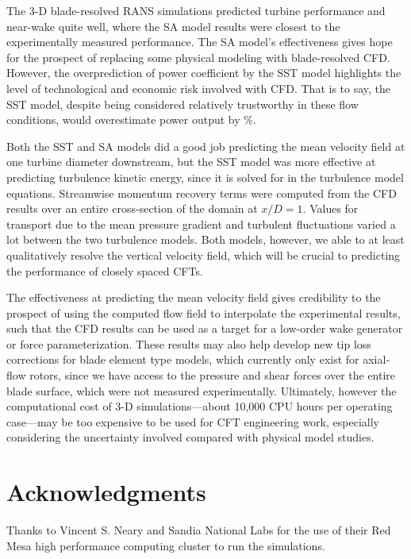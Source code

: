 The 3-D blade-resolved RANS simulations predicted turbine performance and
near-wake quite well, where the SA model results were closest to the
experimentally measured performance. The SA model's effectiveness gives hope for
the prospect of replacing some physical modeling with blade-resolved CFD.
However, the  overprediction of power coefficient by the SST model highlights
the level of technological and economic risk involved with CFD. That is to say,
the SST model, despite being considered relatively trustworthy in these flow
conditions, would overestimate power output by \%.

Both the SST and SA models did a good job predicting the mean velocity field at
one turbine diameter downstream, but the SST model was more effective at
predicting turbulence kinetic energy, since it is solved for in the turbulence
model equations. Streamwise momentum recovery terms were computed from the CFD
results over an entire cross-section of the domain at $x/D=1$. Values for
transport due to the mean pressure gradient and turbulent fluctuations varied a
lot between the two turbulence models. Both models, however, we able to at least
qualitatively resolve the vertical velocity field, which will be crucial to
predicting the performance of closely spaced CFTs.

The effectiveness at predicting the mean velocity field gives credibility to the
prospect of using the computed flow field to interpolate the experimental
results, such that the CFD results can be used as a target for a low-order wake
generator or force parameterization. These results may also help develop new tip
loss corrections for blade element type models, which currently only exist for
axial-flow rotors, since we have access to the pressure and shear forces over
the entire blade surface, which were not measured experimentally. Ultimately,
however the computational cost of 3-D simulations---about 10,000 CPU hours per
operating case---may be too expensive to be used for CFT engineering work,
especially considering the uncertainty involved compared with physical model
studies.


\section{Acknowledgments}

Thanks to Vincent S. Neary and Sandia National Labs for the use of their Red
Mesa high performance computing cluster to run the simulations.

